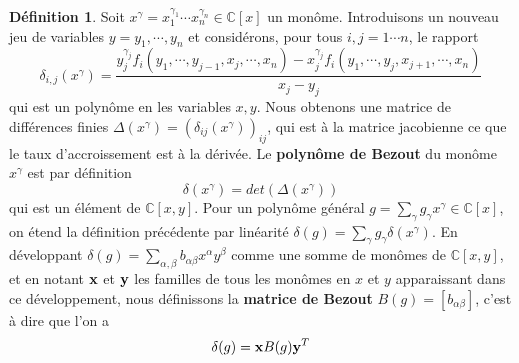 \documentclass{article}
\theoremstyle{plain}%
\theoremstyle{definition}
\newtheorem{defn}{Définition}
\theoremstyle{remark}
\newcommand{\C}{\mathbb{C}}
\begin{document}
\begin{defn}
Soit $x^\gamma = x_1^{\gamma_1}\cdots x_n^{\gamma_n} \in \C[x]$ un monôme. 
Introduisons un nouveau jeu de variables $y = y_1,\cdots, y_n$ et considérons, pour tous $i, j = 1\cdots n$, le rapport
\begin{equation}
\label{finite_diff}
\delta_{i,j}(x^\gamma) = \dfrac{y_j^{\gamma_j}f_i(y_1,\cdots, y_{j-1},x_j,\cdots,x_n) - x_j^{\gamma_j}f_i(y_1,\cdots,y_j,x_{j+1},\cdots,x_n)}{x_j - y_j}
\end{equation}
qui est un polynôme en les variables $x, y$. Nous obtenons une matrice de différences finies $\Delta(x^\gamma) = (\delta_{ij}(x^\gamma))_{ij}$, qui est à la matrice jacobienne ce que le taux d'accroissement est à la dérivée.
Le {\bf polynôme de Bezout} du monôme $x^\gamma$ est par définition
\begin{equation}
	\delta(x^\gamma) = det(\Delta(x^\gamma))
\end{equation}
qui est un élément de $\C[x, y]$. Pour un polynôme général $g = \sum_\gamma g_\gamma x^\gamma \in \C[x]$, on étend la définition précédente par linéarité $\delta(g) = \sum_\gamma g_\gamma \delta(x^\gamma)$. 
En développant $\delta(g) = \sum_{\alpha,\beta} b_{\alpha\beta} x^\alpha y^\beta$ comme une somme de monômes de $\C[x, y]$, et en notant $\bold{x}$ et $\bold{y}$ les familles de tous les monômes en $x$ et $y$ apparaissant dans ce développement, nous définissons la {\bf matrice de Bezout} $B(g) = [b_{\alpha\beta}]$, c'est à dire que l'on a
\begin{equation}
	\delta(g) = \bold{x} B(g) \bold{y}^T
\end{equation}
\end{defn}
\end{document}
